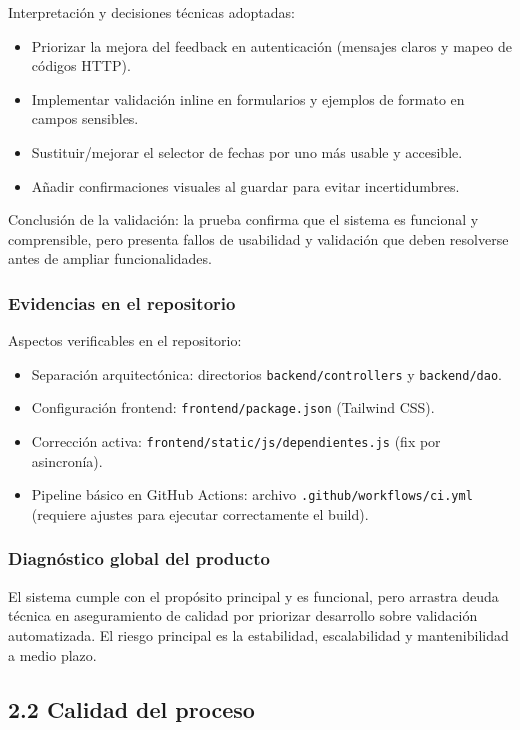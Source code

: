 \documentclass[a4paper,11pt]{article}
\begin{document}
Interpretación y decisiones técnicas adoptadas:
\begin{itemize}
	\item Priorizar la mejora del feedback en autenticación (mensajes claros y mapeo de códigos HTTP).
	\item Implementar validación inline en formularios y ejemplos de formato en campos sensibles.
	\item Sustituir/mejorar el selector de fechas por uno más usable y accesible.
	\item Añadir confirmaciones visuales al guardar para evitar incertidumbres.
\end{itemize}

Conclusión de la validación: la prueba confirma que el sistema es funcional y comprensible, pero presenta fallos de usabilidad y validación que deben resolverse antes de ampliar funcionalidades.

\subsubsection*{Evidencias en el repositorio}

Aspectos verificables en el repositorio:
\begin{itemize}
	\item Separación arquitectónica: directorios \texttt{backend/controllers} y \texttt{backend/dao}.
	\item Configuración frontend: \texttt{frontend/package.json} (Tailwind CSS).
	\item Corrección activa: \texttt{frontend/static/js/dependientes.js} (fix por asincronía).
	\item Pipeline básico en GitHub Actions: archivo \texttt{.github/workflows/ci.yml} (requiere ajustes para ejecutar correctamente el build). 
\end{itemize}

\subsubsection*{Diagnóstico global del producto}

El sistema cumple con el propósito principal y es funcional, pero arrastra deuda técnica en aseguramiento de calidad por priorizar desarrollo sobre validación automatizada. El riesgo principal es la estabilidad, escalabilidad y mantenibilidad a medio plazo.

\subsection*{2.2 Calidad del proceso}
\end{document}
